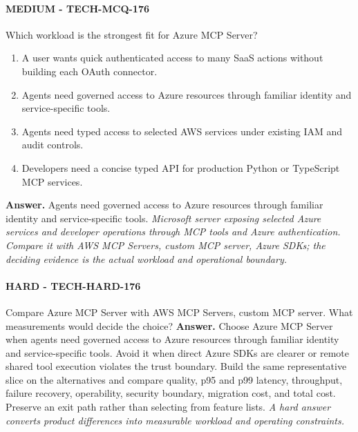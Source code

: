 \paragraph{MEDIUM - TECH-MCQ-176} Which workload is the strongest fit for Azure MCP Server?
\begin{enumerate}[label=\Alph*.]
\item A user wants quick authenticated access to many SaaS actions without building each OAuth connector.
\item Agents need governed access to Azure resources through familiar identity and service-specific tools.
\item Agents need typed access to selected AWS services under existing IAM and audit controls.
\item Developers need a concise typed API for production Python or TypeScript MCP services.
\end{enumerate}
\textbf{Answer.} Agents need governed access to Azure resources through familiar identity and service-specific tools.
\textit{Microsoft server exposing selected Azure services and developer operations through MCP tools and Azure authentication. Compare it with AWS MCP Servers, custom MCP server, Azure SDKs; the deciding evidence is the actual workload and operational boundary.}
\paragraph{HARD - TECH-HARD-176} Compare Azure MCP Server with AWS MCP Servers, custom MCP server. What measurements would decide the choice?
\textbf{Answer.} Choose Azure MCP Server when agents need governed access to Azure resources through familiar identity and service-specific tools. Avoid it when direct Azure SDKs are clearer or remote shared tool execution violates the trust boundary. Build the same representative slice on the alternatives and compare quality, p95 and p99 latency, throughput, failure recovery, operability, security boundary, migration cost, and total cost. Preserve an exit path rather than selecting from feature lists.
\textit{A hard answer converts product differences into measurable workload and operating constraints.}
